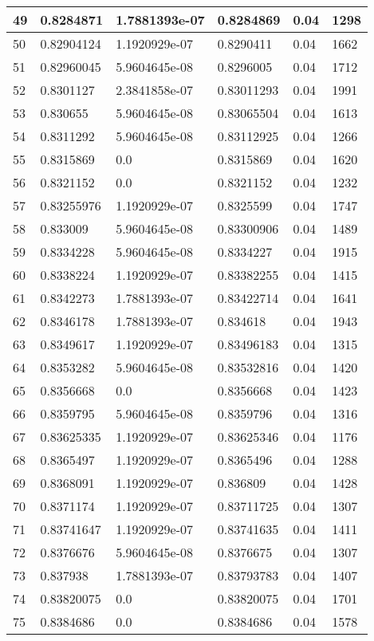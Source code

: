 \begin{longtable}{|l|l|l|l|l|l|}
49 & 0.8284871 & 1.7881393e-07 & 0.8284869 & 0.04 & 1298 \\ \hline 
50 & 0.82904124 & 1.1920929e-07 & 0.8290411 & 0.04 & 1662 \\ \hline 
51 & 0.82960045 & 5.9604645e-08 & 0.8296005 & 0.04 & 1712 \\ \hline 
52 & 0.8301127 & 2.3841858e-07 & 0.83011293 & 0.04 & 1991 \\ \hline 
53 & 0.830655 & 5.9604645e-08 & 0.83065504 & 0.04 & 1613 \\ \hline 
54 & 0.8311292 & 5.9604645e-08 & 0.83112925 & 0.04 & 1266 \\ \hline 
55 & 0.8315869 & 0.0 & 0.8315869 & 0.04 & 1620 \\ \hline 
56 & 0.8321152 & 0.0 & 0.8321152 & 0.04 & 1232 \\ \hline 
57 & 0.83255976 & 1.1920929e-07 & 0.8325599 & 0.04 & 1747 \\ \hline 
58 & 0.833009 & 5.9604645e-08 & 0.83300906 & 0.04 & 1489 \\ \hline 
59 & 0.8334228 & 5.9604645e-08 & 0.8334227 & 0.04 & 1915 \\ \hline 
60 & 0.8338224 & 1.1920929e-07 & 0.83382255 & 0.04 & 1415 \\ \hline 
61 & 0.8342273 & 1.7881393e-07 & 0.83422714 & 0.04 & 1641 \\ \hline 
62 & 0.8346178 & 1.7881393e-07 & 0.834618 & 0.04 & 1943 \\ \hline 
63 & 0.8349617 & 1.1920929e-07 & 0.83496183 & 0.04 & 1315 \\ \hline 
64 & 0.8353282 & 5.9604645e-08 & 0.83532816 & 0.04 & 1420 \\ \hline 
65 & 0.8356668 & 0.0 & 0.8356668 & 0.04 & 1423 \\ \hline 
66 & 0.8359795 & 5.9604645e-08 & 0.8359796 & 0.04 & 1316 \\ \hline 
67 & 0.83625335 & 1.1920929e-07 & 0.83625346 & 0.04 & 1176 \\ \hline 
68 & 0.8365497 & 1.1920929e-07 & 0.8365496 & 0.04 & 1288 \\ \hline 
69 & 0.8368091 & 1.1920929e-07 & 0.836809 & 0.04 & 1428 \\ \hline 
70 & 0.8371174 & 1.1920929e-07 & 0.83711725 & 0.04 & 1307 \\ \hline 
71 & 0.83741647 & 1.1920929e-07 & 0.83741635 & 0.04 & 1411 \\ \hline 
72 & 0.8376676 & 5.9604645e-08 & 0.8376675 & 0.04 & 1307 \\ \hline 
73 & 0.837938 & 1.7881393e-07 & 0.83793783 & 0.04 & 1407 \\ \hline 
74 & 0.83820075 & 0.0 & 0.83820075 & 0.04 & 1701 \\ \hline 
75 & 0.8384686 & 0.0 & 0.8384686 & 0.04 & 1578 \\ \hline 
\end{longtable}